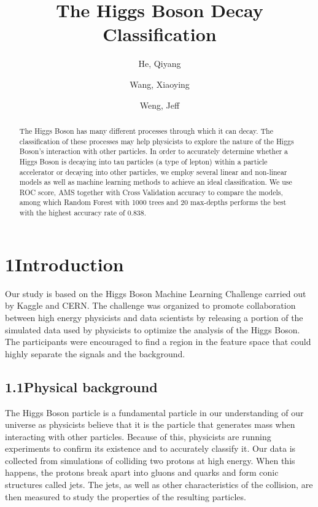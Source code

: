 \documentclass[11pt]{article}
\title{The Higgs Boson Decay Classification}
\author{
  He, Qiyang\\
  \and
  Wang, Xiaoying\\
  \and
  Weng, Jeff\\
}
\begin{document}
\maketitle


\renewcommand{\abstractname}{\large{\textbf{Abstract}}}
\begin{abstract}
The Higgs Boson has many different processes through which it can decay. The classification of these processes may help physicists to explore the nature of the Higgs Boson’s interaction with other particles. In order to accurately determine whether a Higgs Boson is decaying into tau particles (a type of lepton) within a particle accelerator or decaying into other particles, we employ several linear and non-linear models as well as machine learning methods to achieve an ideal classification. We use ROC score, AMS together with Cross Validation accuracy to compare the models, among which Random Forest with 1000 trees and 20 max-depths performs the best with the highest accuracy rate of 0.838.\\

\end{abstract}



\section*{1\quad Introduction}
Our study is based on the Higgs Boson Machine Learning Challenge carried out by Kaggle and CERN. The challenge was organized to promote collaboration between high energy physicists and data scientists by releasing a portion of the simulated data used by physicists to optimize the analysis of the Higgs Boson. The participants were encouraged to find a region in the feature space that could highly separate the signals and the background.    

\subsection*{1.1\quad Physical background}
The Higgs Boson particle is a fundamental particle in our understanding of our universe as physicists believe that it is the particle that generates mass when interacting with other particles. Because of this, physicists are running experiments to confirm its existence and to accurately classify it. Our data is collected from simulations of colliding two protons at high energy. When this happens, the protons break apart into gluons and quarks and form conic structures called jets. The jets, as well as other characteristics of the collision, are then measured to study the properties of the resulting particles.
\end{document}

